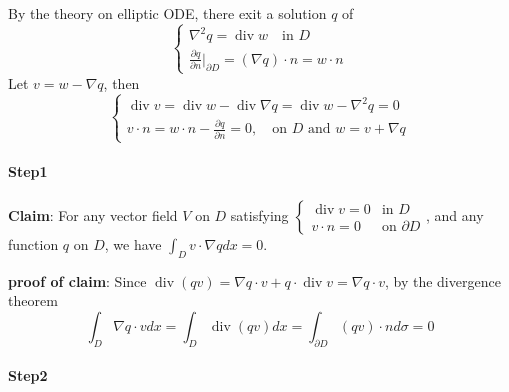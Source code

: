 
By the theory on elliptic ODE, there exit a solution $q$ of 
\begin{equation}
\begin{cases}
\nabla^2 q = \operatorname{div} w\quad\text{in }D\\
\displaystyle \frac{\partial q}{\partial n}\bigg|_{\partial D} = (\nabla q)\cdot n = w\cdot n
\end{cases}
\end{equation}
Let $v=w-\nabla q$, then
\begin{equation}
\begin{cases}
\operatorname{div} v = \operatorname{div}w - \operatorname{div}\nabla q = \operatorname{div}w - \nabla^2 q = 0\\
\displaystyle v\cdot n = w\cdot n - \frac{\partial q}{\partial n}=0,\quad
\text{on $D$ and $w = v + \nabla q$}
\end{cases}
\end{equation}



\paragraph{Step1} %

\textbf{Claim}: For any vector field $V$ on $D$ satisfying $\displaystyle \begin{cases}\operatorname{div}v=0&\text{in $D$}\\ v\cdot n = 0&\text{on $\partial D$}\end{cases}$, and any function $q$ on $D$, we have $\displaystyle \int_{D} v\cdot \nabla q dx = 0$.

\textbf{proof of claim}: Since $\operatorname{div}(qv) = \nabla q \cdot v + q\cdot \operatorname{div}v = \nabla q \cdot v$, by the divergence theorem 
\begin{equation}
\int_{D}\nabla q \cdot v dx = \int_{D} \operatorname{div}(qv) dx = \int_{\partial D}(qv)\cdot n d\sigma = 0
\end{equation}


\paragraph{Step2} %

